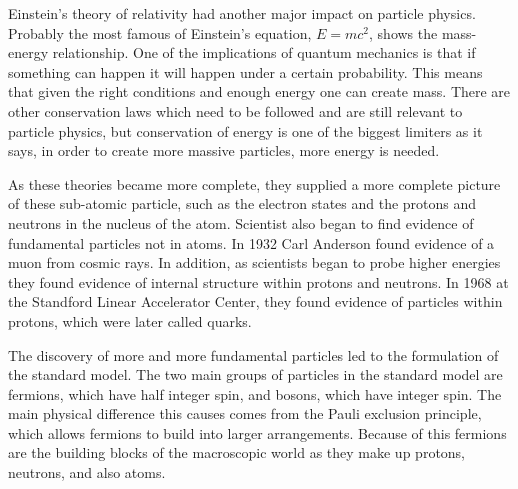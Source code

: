 Einstein's theory of relativity had another major impact on particle physics. Probably the most famous of Einstein's equation, $E = mc^2$, shows the mass-energy relationship. One of the implications of quantum mechanics is that if something can happen it will happen under a certain probability. This means that given the right conditions and enough energy one can create mass. There are other conservation laws which need to be followed and are still relevant to particle physics, but conservation of energy is one of the biggest limiters as it says, in order to create more massive particles, more energy is needed. 

As these theories became more complete, they supplied a more complete picture of these sub-atomic particle, such as the electron states and the protons and neutrons in the nucleus of the atom. Scientist also began to find evidence of fundamental particles not in atoms. In 1932 Carl Anderson found evidence of a muon from cosmic rays. In addition, as scientists began to probe higher energies they found evidence of internal structure within protons and neutrons. In 1968 at the Standford Linear Accelerator Center, they found evidence of particles within protons, which were later called quarks.

The discovery of more and more fundamental particles led to the formulation of the standard model. The two main groups of particles in the standard model are fermions, which have half integer spin, and bosons, which have integer spin. The main physical difference this causes comes from the Pauli exclusion principle, which allows fermions to build into larger arrangements. Because of this fermions are the building blocks of the macroscopic world as they make up protons, neutrons, and also atoms.   

